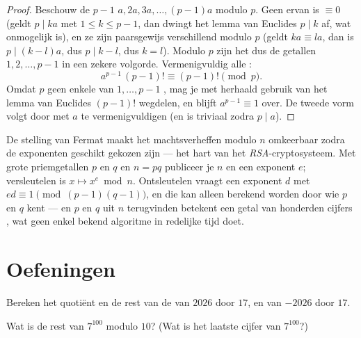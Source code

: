 \begin{proof}
Beschouw de $p - 1$  $a, 2a, 3a, \dots, (p-1)a$ modulo $p$.
Geen ervan is $\equiv 0$ (geldt $p \mid ka$ met $1 \leq k \leq p-1$, dan
dwingt het lemma van Euclides $p \mid k$ af, wat onmogelijk is), en ze zijn
paarsgewijs verschillend modulo $p$ (geldt $ka \equiv la$, dan is
$p \mid (k - l)a$, dus $p \mid k - l$, dus $k = l$). Modulo $p$ zijn het dus
de getallen $1, 2, \dots, p-1$ in een zekere volgorde. Vermenigvuldig alle
:
\[
a^{p-1}\,(p-1)! \equiv (p-1)! \pmod p .
\]
Omdat $p$ geen enkele van $1, \dots, p-1$ , mag je met herhaald gebruik
van het lemma van Euclides $(p-1)!$ wegdelen, en blijft $a^{p-1} \equiv 1$
over. De tweede vorm volgt door met $a$ te vermenigvuldigen (en is triviaal
zodra $p \mid a$).
\end{proof}

\begin{example}\label{ex:g12:arith:rsa}
De stelling van Fermat maakt het machtsverheffen modulo $n$ omkeerbaar zodra
de exponenten geschikt gekozen zijn --- het hart van het
\emph{RSA}-cryptosysteem. Met grote priemgetallen $p$ en $q$ en $n = pq$
publiceer je $n$ en een exponent $e$; versleutelen is $x \mapsto x^e \bmod n$.
Ontsleutelen vraagt een exponent $d$ met $ed \equiv 1 \pmod{(p-1)(q-1)}$, en
die kan alleen berekend worden door wie $p$ en $q$ kent --- en $p$ en $q$ uit
$n$ terugvinden betekent een getal van honderden cijfers , wat geen
enkel bekend algoritme in redelijke tijd doet.
\end{example}

\section{Oefeningen}

\begin{exercise}[$\star$]\label{exo:g12:arith:1}
Bereken het quotiënt en de rest van de  van $2026$ door
$17$, en van $-2026$ door $17$.
\end{exercise}

\begin{exercise}[$\star$]\label{exo:g12:arith:2}
Wat is de rest van $7^{100}$ modulo $10$? (Wat is het laatste cijfer van
$7^{100}$?)
\end{exercise}


